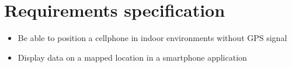 \chapter{Requirements specification}\label{appendix:requirements}
\begin{itemize}
\item Be able to position a cellphone in indoor environments without GPS signal
\item Display data on a mapped location in a smartphone application
\end{itemize}

